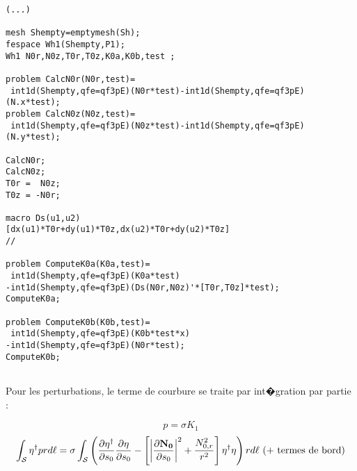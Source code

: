 \documentclass{jfm}
\newcommand\DP[2]{\frac{\partial #1}{\partial #2}}
\begin{document}
\begin{verbatim}
(...)

mesh Shempty=emptymesh(Sh);
fespace Wh1(Shempty,P1);
Wh1 N0r,N0z,T0r,T0z,K0a,K0b,test ;

problem CalcN0r(N0r,test)=
 int1d(Shempty,qfe=qf3pE)(N0r*test)-int1d(Shempty,qfe=qf3pE)(N.x*test);
problem CalcN0z(N0z,test)=
 int1d(Shempty,qfe=qf3pE)(N0z*test)-int1d(Shempty,qfe=qf3pE)(N.y*test);

CalcN0r;
CalcN0z;
T0r =  N0z;
T0z = -N0r;

macro Ds(u1,u2)
[dx(u1)*T0r+dy(u1)*T0z,dx(u2)*T0r+dy(u2)*T0z]
//

problem ComputeK0a(K0a,test)=
 int1d(Shempty,qfe=qf3pE)(K0a*test)
-int1d(Shempty,qfe=qf3pE)(Ds(N0r,N0z)'*[T0r,T0z]*test);
ComputeK0a;

problem ComputeK0b(K0b,test)=
 int1d(Shempty,qfe=qf3pE)(K0b*test*x)
-int1d(Shempty,qfe=qf3pE)(N0r*test);
ComputeK0b;


\end{verbatim}


Pour les perturbations, le terme de courbure se traite par int�gration par partie :

$$
p = \sigma K_1 
$$
$$
\int_{\cal S}  \eta^\dag p r d \ell 
 = \sigma 
 \int_{\cal S} \left (
 \DP{\eta^\dag}{s_0} \DP{\eta}{s_0} - \left[ \left| \DP{\bf N_0}{s_0} \right|^2  + \frac{N_{0,r}^2}{r^2} \right]  \eta^\dag \eta \right) r d \ell 
\mbox{ (+ termes de bord)} 
$$





\end{document}
